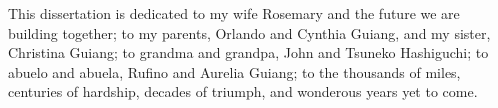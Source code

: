 \begin{dedication}
\setsinglespacing
\parindent0pt\parskip\baselineskip
\begin{center}
This dissertation is dedicated to my wife Rosemary and the future we are building together; 
to my parents, Orlando and Cynthia Guiang, and my sister, Christina Guiang;  
to grandma and grandpa, John and Tsuneko Hashiguchi; 
to abuelo and abuela, Rufino and Aurelia Guiang; 
to the thousands of miles, centuries of hardship, decades of triumph, and wonderous years yet to come.
\end{center}
\end{dedication}
